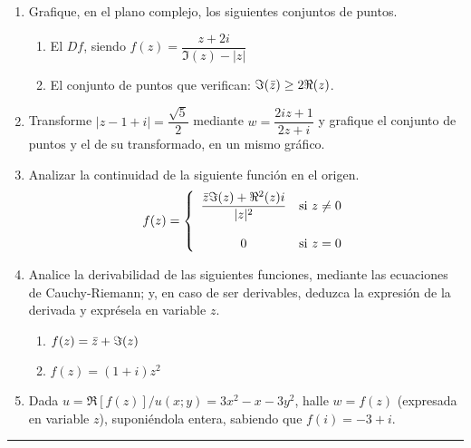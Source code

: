 \documentclass[9pt,a4paper]{extarticle}
\begin{document}
\begin{enumerate}
\item Grafique, en el plano complejo, los siguientes conjuntos de puntos.
\begin{enumerate}
    \item El $Df$, siendo $f(z)=\dfrac{z+2i}{\Im(z)-|z|}$
    \item El conjunto de puntos que verifican: $\Im(\Bar{z})\geq 2\Re(z)$.
\end{enumerate}
\item Transforme $|z-1+i|=\dfrac{\sqrt{5}}{2}$ mediante $w=\dfrac{2iz+1}{2z+i}$ y grafique el conjunto de puntos y el de su transformado, en un mismo gráfico.
\item Analizar la continuidad de la siguiente función en el origen.
$$
     f(z) = \left\{
	       \begin{array}{cc}
		 \dfrac{\Bar{z}\Im(z)+\Re^2(z)i}{|z|^2}      & \mathrm{si\ } z \neq 0 \\
		 &\\
		 0     & \mathrm{si\ } z = 0
	       \end{array}
	     \right.
$$
\item Analice la derivabilidad de las siguientes funciones, mediante las ecuaciones de Cauchy-Riemann; y, en caso de ser derivables, deduzca la expresión de la derivada y exprésela en variable $z$.
\begin{enumerate}
    \item $f(z)=\Bar{z}+\Im(z)$
    \item $f(z)=(1+i)z^2$
\end{enumerate}
\item Dada $u=\Re[f(z)]/u(x;y)=3x^2-x-3y^2$, halle $w=f(z)$ (expresada en variable $z$), suponiéndola entera, sabiendo que $f(i)=-3+i$.
\end{enumerate}
\hrule
\end{document}
